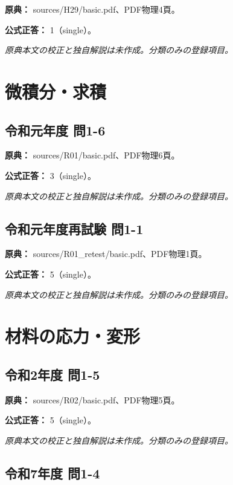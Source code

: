 \noindent\textbf{原典：} sources/H29/basic.pdf、PDF物理4頁。

\textbf{公式正答：} 1（single）。

\par\textit{原典本文の校正と独自解説は未作成。分類のみの登録項目。}

\section{微積分・求積}

\subsection{令和元年度 問1-6}
\label{q:r01-reg-basic-1-6}

\noindent\textbf{原典：} sources/R01/basic.pdf、PDF物理6頁。

\textbf{公式正答：} 3（single）。

\par\textit{原典本文の校正と独自解説は未作成。分類のみの登録項目。}

\subsection{令和元年度再試験 問1-1}
\label{q:r01-ret-basic-1-1}

\noindent\textbf{原典：} sources/R01\_retest/basic.pdf、PDF物理1頁。

\textbf{公式正答：} 5（single）。

\par\textit{原典本文の校正と独自解説は未作成。分類のみの登録項目。}

\section{材料の応力・変形}

\subsection{令和2年度 問1-5}
\label{q:r02-reg-basic-1-5}

\noindent\textbf{原典：} sources/R02/basic.pdf、PDF物理5頁。

\textbf{公式正答：} 5（single）。

\par\textit{原典本文の校正と独自解説は未作成。分類のみの登録項目。}

\subsection{令和7年度 問1-4}
\label{q:r07-reg-basic-1-4}

